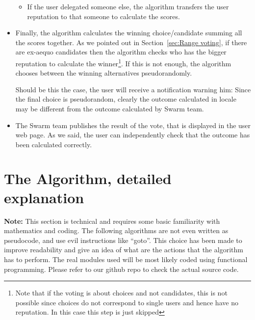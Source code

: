 \documentclass[submission, copyright,creativecommons,sharealike,noncommercial]{eptcs}
\begin{document}
\begin{itemize}
\begin{itemize}
				\item If the user delegated someone else, the algorithm transfers the user reputation to that someone to calculate the scores.
			\end{itemize}
			\item Finally, the algorithm calculates the winning choice/candidate summing all the scores together. As we pointed out in Section~\ref{sec:Range voting}, if there are ex-aequo candidates then the algorithm checks who has the bigger reputation to calculate the winner\footnote{Note that if the voting is about choices and not candidates, this is not possible since choices do not correspond to single users and hence have no reputation. In this case this step is just skipped}. If this is not enough, the algorithm chooses between the winning alternatives pseudorandomly.
			
			Should be this the case, the user will receive a notification warning him: Since the final choice is pseudorandom, clearly the outcome calculated in locale may be different from the outcome calculated by Swarm team.
			
			\item The Swarm team publishes the result of the vote, that is displayed in the user web page. As we said, the user can independently check that the outcome has been calculated correctly.
		\end{itemize}
%
%
\section{The Algorithm, detailed explanation}\label{sec:Algorithm technical explanation}
%
	\textbf{Note:} This section is technical and requires some basic familiarity with mathematics and coding. The following algorithms are not even written as pseudocode, and use evil instructions like ``goto''. This choice has been made to improve readability and give an idea of what are the actions that the algorithm has to perform. The real modules used will be most likely coded using functional programming. Please refer to our github repo to check the actual source code.
%
%
\end{document}
